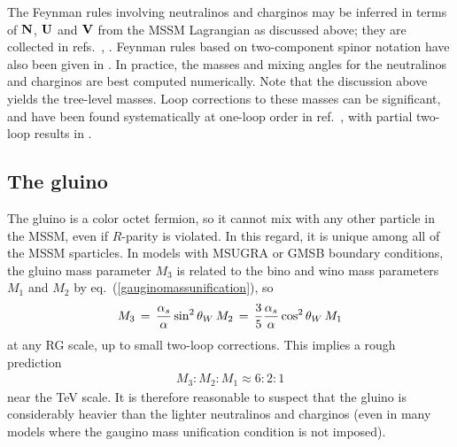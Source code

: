 \documentclass[11pt]{article}
\def\beq{\begin{eqnarray}}
\def\eeq{\end{eqnarray}}
\begin{document}
The Feynman rules involving neutralinos and charginos may be inferred in 
terms of $\bf N$, $\bf U$ and $\bf V$ from the MSSM Lagrangian as 
discussed above; they are collected in 
refs.~\cite{HaberKanereview}, \cite{GunionHaber}. 
Feynman rules 
based on two-component spinor notation have also  been given in 
\cite{DHM}.
In practice, the masses and mixing angles for the 
neutralinos and charginos are best computed numerically. Note that the 
discussion above yields the tree-level masses. Loop corrections to these 
masses can be significant, and have been found systematically at one-loop 
order in ref.~\cite{PBMZ}, with partial two-loop results in
\cite{GNCpoletwo,NCpole}.

\subsection{The gluino\label{subsec:MSSMspectrum.gluino}}
\setcounter{equation}{0}
\setcounter{footnote}{1}

The gluino is a color octet fermion, so it cannot mix with any other 
particle in the MSSM, even if $R$-parity is violated. In this regard, it 
is unique among all of the MSSM sparticles. In models with MSUGRA 
or GMSB boundary conditions, 
the gluino mass 
parameter $M_3$ is related to the bino and wino mass parameters $M_1$ and 
$M_2$ by eq.~(\ref{gauginomassunification}), so
\beq
M_3 \,=\, {\alpha_s\over \alpha} \sin^2\theta_W\, 
M_2 \,=\, {3\over 5} {\alpha_s \over \alpha} \cos^2\theta_W\, M_1
\label{eq:TiaEla}
\eeq
at any RG scale, up to small two-loop corrections. This implies a rough 
prediction
\beq
M_3 : M_2 : M_1 \approx 6:2:1
\eeq
near the TeV scale. It is therefore
reasonable to suspect that the gluino 
is considerably heavier than the lighter neutralinos and charginos
(even in many models where the gaugino mass unification condition is not
imposed).
\end{document}
